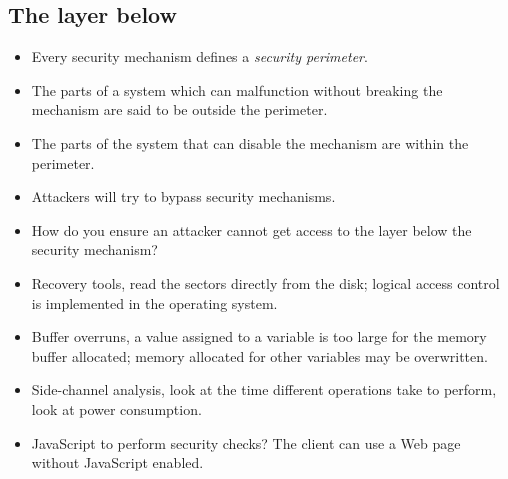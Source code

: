 \subsection{The layer below}

\begin{frame}
  \begin{itemize}
    \item Every security mechanism defines a \emph{security perimeter}.

    \item The parts of a system which can malfunction without breaking the 
      mechanism are said to be outside the perimeter.

    \item The parts of the system that can disable the mechanism are within the 
      perimeter.
  \end{itemize}
\end{frame}

\begin{frame}
  \begin{itemize}
    \item Attackers will try to bypass security mechanisms.

    \item How do you ensure an attacker cannot get access to the layer below 
      the security mechanism?
  \end{itemize}
\end{frame}

\begin{frame}
  \begin{itemize}
    \item Recovery tools, read the sectors directly from the disk; logical 
      access control is implemented in the operating system.

    \item Buffer overruns, a value assigned to a variable is too large for the 
      memory buffer allocated; memory allocated for other variables may be 
      overwritten.

    \item Side-channel analysis, look at the time different operations take to 
      perform, look at power consumption.

    \item JavaScript to perform security checks?
      The client can use a Web page without JavaScript enabled.

  \end{itemize}
\end{frame}



\begin{frame}[allowframebreaks]
  \small
  \printbibliography{}
\end{frame}

